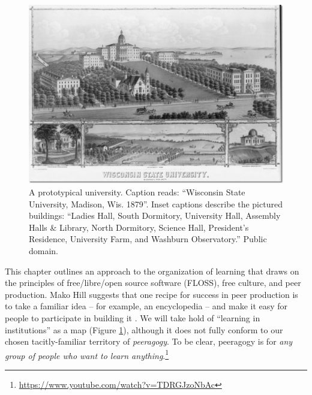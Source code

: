 \begin{refsection}

\begin{figure}
\begin{center}
\includegraphics[width=.9\textwidth,trim=0 30 10 2, clip=true]{./images/wisconsin-map.jpg}
\end{center}
\vspace{-.2cm}
\caption{A prototypical university.  Caption reads: ``Wisconsin State
  University, Madison, Wis. 1879''.  Inset captions describe the
  pictured buildings: ``Ladies Hall, South Dormitory, University Hall,
  Assembly Halls \& Library, North Dormitory, Science Hall, President's
  Residence, University Farm, and Washburn Observatory.''  Public
  domain.\label{madison-map}}
\end{figure}

This chapter outlines an approach to the organization of learning that draws on the principles of free\slash libre\slash open source software (FLOSS), free culture, and peer production.
Mako Hill suggests that one recipe for success in peer production is to take a familiar idea -- for example, an encyclopedia -- and make it easy for people to participate in building it \cite[Chapter 1]{mako-thesis}.  We will take hold of ``learning in institutions'' as a map (Figure \ref{madison-map}), although it does not fully conform to our chosen tacitly-familiar territory of \emph{peeragogy}.  To be clear, peeragogy is for \emph{any group of people who want to learn anything}.\footnote{\url{https://www.youtube.com/watch?v=TDRGJzoNbAc}}
 


\end{refsection}
